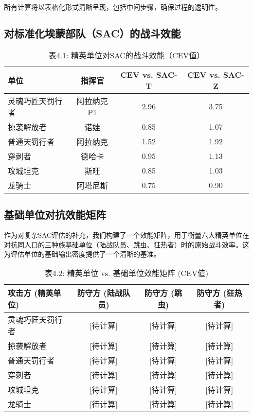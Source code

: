 \documentclass[a4paper,12pt]{article}
\begin{document}
所有计算将以表格化形式清晰呈现，包括中间步骤，确保过程的透明性。

\subsection{对标准化埃蒙部队（SAC）的战斗效能}
\begin{table}[h!]
\centering
\caption{表4.1: 精英单位对SAC的战斗效能（CEV值）}
\begin{tabular}{lccc}
\toprule
\textbf{单位} & \textbf{指挥官} & \textbf{CEV vs. SAC-T} & \textbf{CEV vs. SAC-Z} \\
\midrule
灵魂巧匠天罚行者 & 阿拉纳克P1 & 2.96 & 3.75 \\
掠袭解放者 & 诺娃 & 0.85 & 1.07 \\
普通天罚行者 & 阿拉纳克 & 1.52 & 1.92 \\
穿刺者 & 德哈卡 & 0.95 & 1.13 \\
攻城坦克 & 斯旺 & 0.85 & 1.03 \\
龙骑士 & 阿塔尼斯 & 0.75 & 0.90 \\
\bottomrule
\end{tabular}
\end{table}

\subsection{基础单位对抗效能矩阵}
作为对复杂SAC评估的补充，我们构建了一个效能矩阵，用于衡量六大精英单位在对抗同人口的三种族基础单位（陆战队员、跳虫、狂热者）时的原始战斗效率。这为评估单位的基础输出密度提供了一个清晰的基准。

\begin{table}[h!]
\centering
\caption{表4.2: 精英单位 vs. 基础单位效能矩阵 (CEV值)}
\begin{tabular}{lccc}
\toprule
\textbf{攻击方 (精英单位)} & \textbf{防守方 (陆战队员)} & \textbf{防守方 (跳虫)} & \textbf{防守方 (狂热者)} \\
\midrule
灵魂巧匠天罚行者 & [待计算] & [待计算] & [待计算] \\
掠袭解放者 & [待计算] & [待计算] & [待计算] \\
普通天罚行者 & [待计算] & [待计算] & [待计算] \\
穿刺者 & [待计算] & [待计算] & [待计算] \\
攻城坦克 & [待计算] & [待计算] & [待计算] \\
龙骑士 & [待计算] & [待计算] & [待计算] \\
\bottomrule
\end{tabular}
\end{table}
\end{document}
